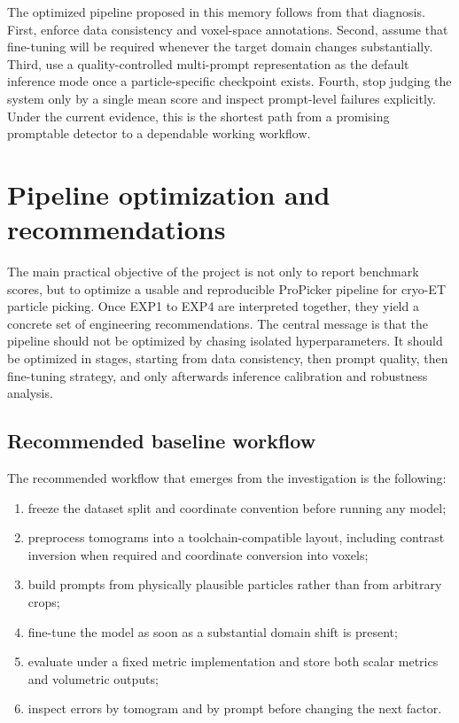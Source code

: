 \documentclass[12pt,a4paper]{report}
\begin{document}
The optimized pipeline proposed in this memory follows from that diagnosis. First, enforce data consistency and voxel-space annotations. Second, assume that fine-tuning will be required whenever the target domain changes substantially. Third, use a quality-controlled multi-prompt representation as the default inference mode once a particle-specific checkpoint exists. Fourth, stop judging the system only by a single mean score and inspect prompt-level failures explicitly. Under the current evidence, this is the shortest path from a promising promptable detector to a dependable working workflow.

\section{Pipeline optimization and recommendations}
The main practical objective of the project is not only to report benchmark scores, but to optimize a usable and reproducible ProPicker pipeline for cryo-ET particle picking. Once EXP1 to EXP4 are interpreted together, they yield a concrete set of engineering recommendations. The central message is that the pipeline should not be optimized by chasing isolated hyperparameters. It should be optimized in stages, starting from data consistency, then prompt quality, then fine-tuning strategy, and only afterwards inference calibration and robustness analysis.

\subsection{Recommended baseline workflow}
The recommended workflow that emerges from the investigation is the following:
\begin{enumerate}
  \item freeze the dataset split and coordinate convention before running any model;
  \item preprocess tomograms into a toolchain-compatible layout, including contrast inversion when required and coordinate conversion into voxels;
  \item build prompts from physically plausible particles rather than from arbitrary crops;
  \item fine-tune the model as soon as a substantial domain shift is present;
  \item evaluate under a fixed metric implementation and store both scalar metrics and volumetric outputs;
  \item inspect errors by tomogram and by prompt before changing the next factor.
\end{enumerate}
\end{document}
